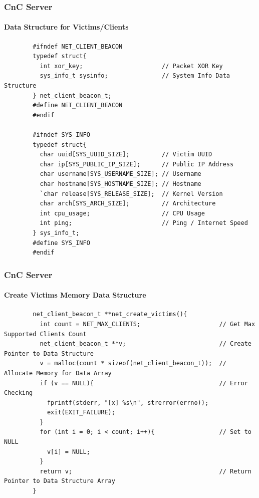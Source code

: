 \documentclass[aspectratio=169]{beamer}
\begin{document}
\begin{frame}[fragile]{}
  \frametitle{CnC Server}
  \framesubtitle{Data Structure for Victims/Clients}
  \begin{center}
    \begin{tcolorbox}[title=net.c,colback=black]
    \begin{minipage}{0.5\textwidth}
      \begin{verbatim}
        #ifndef NET_CLIENT_BEACON
        typedef struct{
          int xor_key;                      // Packet XOR Key
          sys_info_t sysinfo;               // System Info Data Structure
        } net_client_beacon_t;
        #define NET_CLIENT_BEACON
        #endif

        #ifndef SYS_INFO
        typedef struct{
          char uuid[SYS_UUID_SIZE];         // Victim UUID
          char ip[SYS_PUBLIC_IP_SIZE];      // Public IP Address
          char username[SYS_USERNAME_SIZE]; // Username
          char hostname[SYS_HOSTNAME_SIZE]; // Hostname
          `char release[SYS_RELEASE_SIZE];  // Kernel Version
          char arch[SYS_ARCH_SIZE];         // Architecture
          int cpu_usage;                    // CPU Usage
          int ping;                         // Ping / Internet Speed
        } sys_info_t;
        #define SYS_INFO
        #endif
      \end{verbatim}
    \end{minipage}
    \end{tcolorbox}
  \end{center}
\end{frame}

\begin{frame}[fragile]{}
  \frametitle{CnC Server}
  \framesubtitle{Create Victims Memory Data Structure}
  \begin{center}
    \begin{tcolorbox}[title=net.c,colback=black]
    \begin{minipage}{0.5\textwidth}
      \begin{verbatim}
        net_client_beacon_t **net_create_victims(){
          int count = NET_MAX_CLIENTS;                      // Get Max Supported Clients Count
          net_client_beacon_t **v;                          // Create Pointer to Data Structure
          v = malloc(count * sizeof(net_client_beacon_t));  // Allocate Memory for Data Array
          if (v == NULL){                                   // Error Checking
            fprintf(stderr, "[x] %s\n", strerror(errno));
            exit(EXIT_FAILURE);
          }
          for (int i = 0; i < count; i++){                  // Set to NULL
            v[i] = NULL;
          }
          return v;                                         // Return Pointer to Data Structure Array
        }
      \end{verbatim}
    \end{minipage}
    \end{tcolorbox}
  \end{center}
\end{frame}
\end{document}
